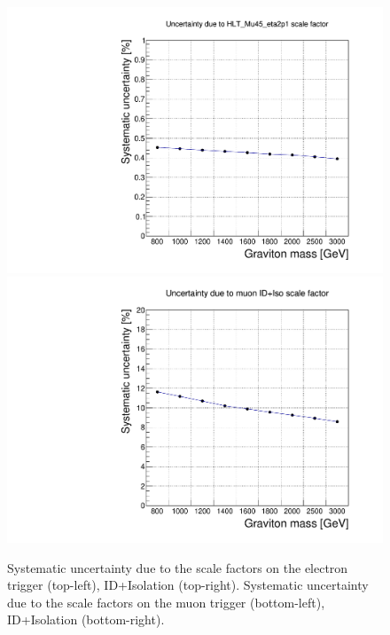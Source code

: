\begin{figure}[h]
\begin{center}
\includegraphics[scale=0.33]{figures/systematics/hltMuSFunc.pdf}
\includegraphics[scale=0.33]{figures/systematics/IDIsoMuSFunc.pdf}\\
\caption[Uncertainties due to lepton selection]{Systematic uncertainty due to the scale factors on the electron trigger (top-left), ID+Isolation (top-right). Systematic uncertainty due to the scale factors on the muon trigger (bottom-left), ID+Isolation (bottom-right).}
\label{fig:leptonUnc}
\end{center}
\end{figure}
